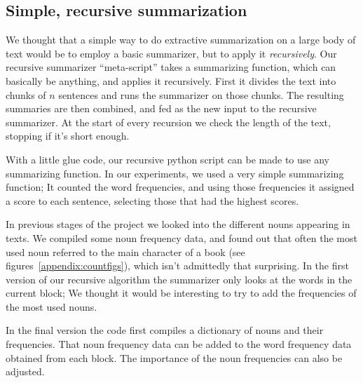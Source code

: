\subsection{Simple, recursive summarization}

We thought that a simple way to do extractive summarization on a large body of
text would be to employ a basic summarizer, but to apply it
\textit{recursively}. Our recursive summarizer ``meta-script'' takes a
summarizing function, which can basically be anything, and applies it
recursively. First it divides the text into chunks of \(n\) sentences and runs
the summarizer on those chunks. The resulting summaries are then combined, and
fed as the new input to the recursive summarizer. At the start of every
recursion we check the length of the text, stopping if it's short enough.

With a little glue code, our recursive python script can be made to use any
summarizing function. In our experiments, we used a very simple summarizing
function; It counted the word frequencies, and using those frequencies it
assigned a score to each sentence, selecting those that had the highest scores.

In previous stages of the project we looked into the different nouns appearing
in texts. We compiled some noun frequency data, and found out that
often the most used noun referred to the main character of a book (see
figures~\ref{appendix:countfigs}), which isn't
admittedly that surprising. In the first version of our recursive algorithm the
summarizer only looks at the words in the current block; We thought it would be
interesting to try to add the frequencies of the most used nouns. 

In the final version the code first compiles a dictionary of nouns and their
frequencies. That noun frequency data can be added to the word frequency data
obtained from each block. The importance of the noun frequencies can also be
adjusted.
